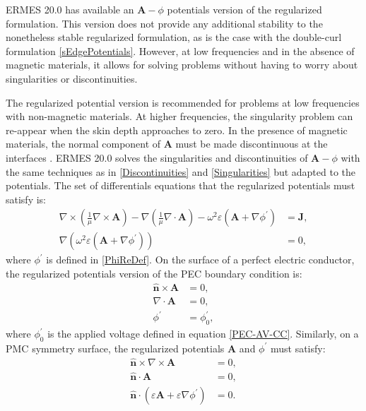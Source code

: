 ERMES 20.0 has available an $\textbf{A}-\phi$ potentials version of the regularized formulation. This version does not provide any additional stability to the nonetheless stable regularized formulation, as is the case with the double-curl formulation \ref{sEdgePotentials}. However, at low frequencies and in the absence of magnetic materials, it allows for solving problems without having to worry about singularities or discontinuities.

The regularized potential version is recommended for problems at low frequencies with non-magnetic materials. At higher frequencies, the singularity problem can re-appear when the skin depth approaches to zero. In the presence of magnetic materials, the normal component of \textbf{A} must be made discontinuous at the interfaces \cite{PotentialsBiro}. ERMES 20.0 solves the singularities and discontinuities of $\textbf{A}-\phi$ with the same techniques as in \ref{Discontinuities} and \ref{Singularities} but adapted to the potentials. The set of differentials equations that the regularized potentials must satisfy is:
\begin{equation}\label{RMAVDE}
	\begin{aligned}
		\nabla\times\left(\frac{1}{\mu}\nabla\times\mathbf{A}\right) - \nabla\left(\frac{1}{\mu}\nabla\cdot\mathbf{A}\right) - \omega^{2}\varepsilon\left(\mathbf{A} + \nabla\phi^{'}\right) &= \mathbf{J},
		\\
		\nabla\left(\omega^{2}\varepsilon\left(\mathbf{A} + \nabla\phi^{'}\right)\right) &= 0,
	\end{aligned}
\end{equation}
where $\phi^{'}$ is defined in \ref{PhiReDef}. On the surface of a perfect electric conductor, the regularized potentials version of the PEC boundary condition is: 
\begin{equation}\label{PEC-AV-RM}
	\begin{aligned}
		\mathbf{\hat{n}}\times\mathbf{A} &= 0,
		\\
		\nabla\cdot\mathbf{A} &= 0,
		\\
		\phi^{'} &= \phi^{'}_{0},
	\end{aligned}
\end{equation}
where $\phi^{'}_{0}$ is the applied voltage defined in equation \ref{PEC-AV-CC}. Similarly, on a PMC symmetry surface, the regularized potentials $\textbf{A}$ and $\phi^{'}$ must satisfy:
\begin{equation}
	\begin{aligned}
		\mathbf{\hat{n}}\times\nabla\times\mathbf{A} &= 0,
		\\
		\mathbf{\hat{n}}\cdot\mathbf{A} &= 0,
		\\
		\mathbf{\hat{n}}\cdot\left(\varepsilon\mathbf{A} + \varepsilon\nabla\phi^{'}\right) &= 0.
	\end{aligned}
\end{equation}
